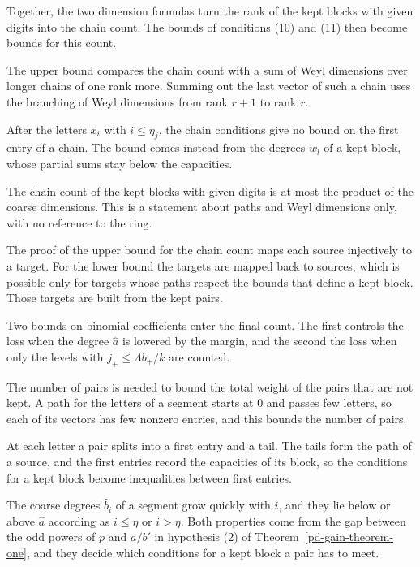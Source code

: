 Together, the two dimension formulas turn the rank of the kept blocks with given digits into the chain
count. The bounds of conditions (10) and (11) then become bounds for this count.

The upper bound compares the chain count with a sum of Weyl dimensions over longer chains of one rank more.
Summing out the last vector of such a chain uses the branching of Weyl dimensions from rank $r+1$ to
rank $r$.

After the letters $x_i$ with $i\leq\eta_j$, the chain conditions give no bound on the first entry of a
chain. The bound comes instead from the degrees $w_l$ of a kept block, whose partial sums stay below the
capacities.

The chain count of the kept blocks with given digits is at most the product of the coarse dimensions. This
is a statement about paths and Weyl dimensions only, with no reference to the ring.

The proof of the upper bound for the chain count maps each source injectively to a target. For the lower bound the
targets are mapped back to sources, which is possible only for targets whose paths respect the bounds that define a
kept block. Those targets are built from the kept pairs.

Two bounds on binomial coefficients enter the final count. The first controls the loss when the degree $\hat a$ is
lowered by the margin, and the second the loss when only the levels with $j_+\leq\Lambda b_+/k$ are counted.

The number of pairs is needed to bound the total weight of the pairs that are not kept. A path for the letters of a
segment starts at $0$ and passes few letters, so each of its vectors has few nonzero entries, and this bounds the number
of pairs.

At each letter a pair splits into a first entry and a tail. The tails form the path of a source, and the first entries
record the capacities of its block, so the conditions for a kept block become inequalities between first entries.

The coarse degrees $\hat b_i$ of a segment grow quickly with $i$, and they lie below or above $\hat a$ according as
$i\leq\eta$ or $i>\eta$. Both properties come from the gap between the odd powers of $p$ and $a/b'$ in hypothesis (2) of
Theorem~\ref{pd-gain-theorem-one}, and they decide which conditions for a kept block a pair has to meet.


